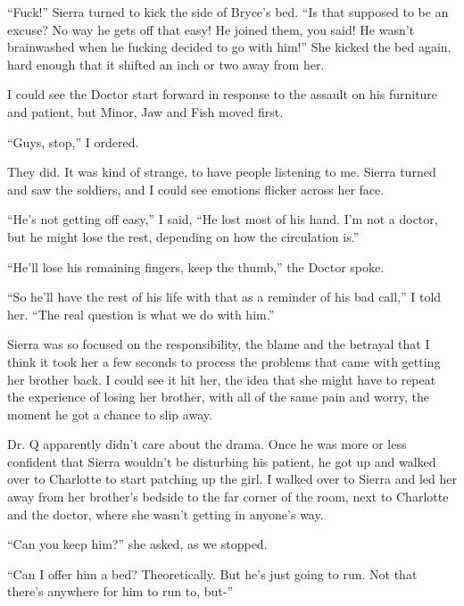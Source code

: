 ``Fuck!''  Sierra turned to kick the side of Bryce's bed. ``Is that supposed to be an excuse?  No way he gets off that easy!  He joined them, you said!  He wasn't brainwashed when he fucking decided to go with him!''  She kicked the bed again, hard enough that it shifted an inch or two away from her.



I could see the Doctor start forward in response to the assault on his furniture and patient, but Minor, Jaw and Fish moved first.



``Guys, stop,'' I ordered.



They did.  It was kind of strange, to have people listening to me.  Sierra turned and saw the soldiers, and I could see emotions flicker across her face.



``He's not getting off easy,'' I said, ``He lost most of his hand.  I'm not a doctor, but he might lose the rest, depending on how the circulation is.''



``He'll lose his remaining fingers, keep the thumb,'' the Doctor spoke.



``So he'll have the rest of his life with that as a reminder of his bad call,'' I told her.  ``The real question is what we do with him.''



Sierra was so focused on the responsibility, the blame and the betrayal that I think it took her a few seconds to process the problems that came with getting her brother back.  I could see it hit her, the idea that she might have to repeat the experience of losing her brother, with all of the same pain and worry, the moment he got a chance to slip away.



Dr. Q apparently didn't care about the drama.  Once he was more or less confident that Sierra wouldn't be disturbing his patient, he got up and walked over to Charlotte to start patching up the girl.  I walked over to Sierra and led her away from her brother's bedside to the far corner of the room, next to Charlotte and the doctor, where she wasn't getting in anyone's way.



``Can you keep him?'' she asked, as we stopped.



``Can I offer him a bed?  Theoretically.  But he's just going to run.  Not that there's anywhere for him to run to, but-''



